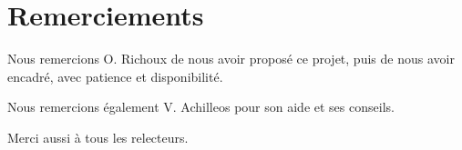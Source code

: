 \section*{Remerciements}

Nous remercions O. Richoux de nous avoir proposé ce projet, puis de nous avoir encadré, avec patience et disponibilité.

Nous remercions également V. Achilleos pour son aide et ses conseils.

Merci aussi à tous les relecteurs.



